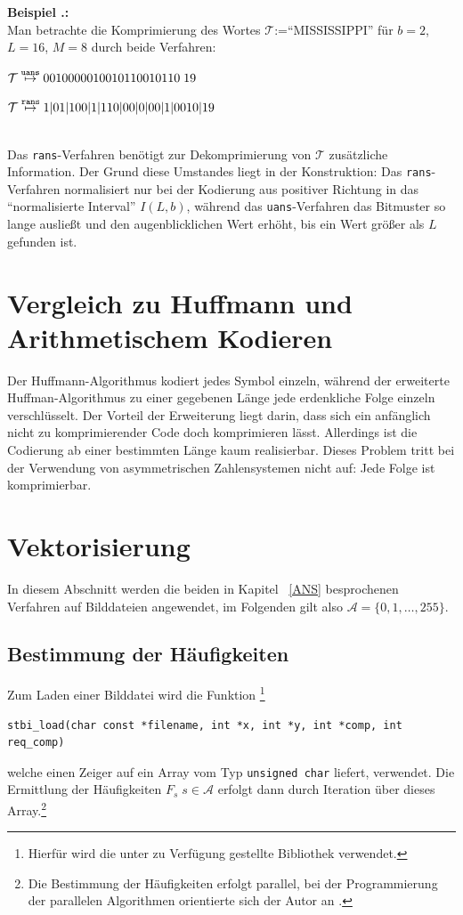 \documentclass[a4paper,12pt]{article}
\newcommand{\A}{\mathcal A}
\newcounter{Beispiel}
\newcounter{Algorithmus}
\newenvironment{Beispiel}{
\medskip
        
        \setlength{\parindent}{0pt}
        \addtocounter{Beispiel}{1}
        \textbf{\textsf{Beispiel \thesubsection.\theBeispiel}:}\\}{
        \nopagebreak
        \vspace{-1.0ex}
        \bigskip
        
}
\begin{document}
\begin{Beispiel}
Man betrachte die Komprimierung des Wortes $\mathcal{T}$:="`MISSISSIPPI"'  für $b=2$, $L=16$, $M=8$ durch beide Verfahren:
\par
\vspace{0.5cm}
\begin{minipage}[h]{.5\textwidth}
$\mathcal{T}\stackrel{{\tt{uans}}}{\mapsto} 0010000010010110010110\;19$
\end{minipage}
\hfill
 \begin{minipage}[h]{.5\textwidth}
$\mathcal{T}\stackrel{{\tt{rans}}}{\mapsto} 1|01|100|1|110|00|0|00|1|0010|19$
\end{minipage}   
\vspace{0.5cm}
\\
Das {\tt{rans}}-Verfahren benötigt zur Dekomprimierung von $\mathcal{T}$ zusätzliche Information. Der Grund diese Umstandes liegt in der Konstruktion: Das {\tt{rans}}-Verfahren normalisiert nur bei der Kodierung aus positiver Richtung in das "`normalisierte Interval"' $I(L,b)$, während das {\tt{uans}}-Verfahren das Bitmuster so lange ausließt und den augenblicklichen Wert erhöht, bis ein Wert größer als $L$ gefunden ist.
\end{Beispiel}

\section{Vergleich zu Huffmann und Arithmetischem Kodieren}
Der Huffmann-Algorithmus kodiert jedes Symbol einzeln, während der erweiterte Huffman-Algorithmus zu einer gegebenen Länge jede erdenkliche Folge einzeln verschlüsselt. Der Vorteil der Erweiterung liegt darin, dass sich ein anfänglich nicht zu komprimierender Code doch komprimieren lässt. Allerdings ist die Codierung ab einer bestimmten Länge kaum realisierbar. Dieses Problem tritt bei der Verwendung von asymmetrischen Zahlensystemen nicht auf: Jede Folge ist komprimierbar.

\newpage
\section{Vektorisierung}
In diesem Abschnitt werden die beiden in Kapitel ~\ref{ANS} besprochenen Verfahren auf Bilddateien angewendet, im Folgenden gilt also
 $\A=\{0,1,\ldots,255\}$.  
\subsection{Bestimmung der Häufigkeiten}
Zum Laden einer Bilddatei wird die Funktion \footnote{Hierfür wird die unter \cite{Barret} zu Verfügung gestellte Bibliothek verwendet.} 
\begin{verbatim}
stbi_load(char const *filename, int *x, int *y, int *comp, int req_comp)
\end{verbatim}
 welche einen Zeiger auf ein Array vom Typ {\tt{unsigned char}} liefert, verwendet.
Die Ermittlung der Häufigkeiten $F_{s}\;s\in\A$  erfolgt dann durch Iteration über dieses Array.\footnote{Die Bestimmung der Häufigkeiten erfolgt parallel, bei der Programmierung der parallelen Algorithmen orientierte sich der Autor an \cite{Williams}.}
\end{document}
